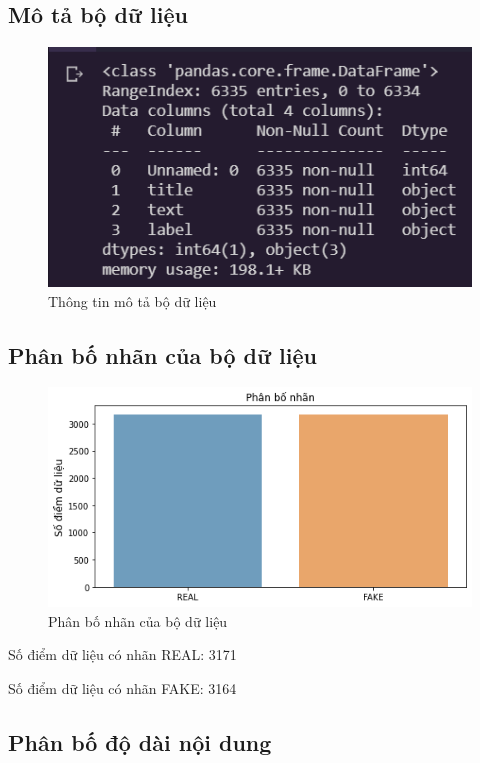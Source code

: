\documentclass[12pt,a4paper,oneside]{book}
\begin{document}
	\subsection{Mô tả bộ dữ liệu}
				\begin{figure}[H]
					\begin{center}
						\includegraphics[width=0.78\columnwidth]{dfinfo}
					\end{center}
					\caption{Thông tin mô tả bộ dữ liệu}
				\end{figure}
	\subsection{Phân bố nhãn của bộ dữ liệu}
			\begin{figure}[H]
				\begin{center}
					\includegraphics[width=0.8\columnwidth]{phanbonhan}
				\end{center}
				\caption{Phân bố nhãn của bộ dữ liệu}
			\end{figure}
			
	Số điểm dữ liệu có nhãn REAL: 3171
	
	Số điểm dữ liệu có nhãn FAKE: 3164

	\subsection{Phân bố độ dài nội dung}
	
\end{document}
